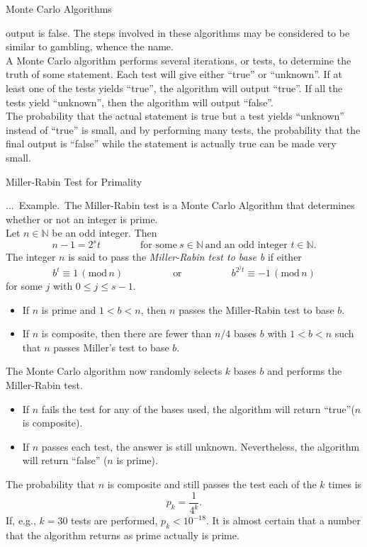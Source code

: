 \documentclass[smaller,hyperref={CJKbookmarks=true}]{beamer}
\newcommand{\N}{\mathbb{N}} \newcommand{\Z}{\mathbb{Z}} \newcommand{\Q}{\mathbb{Q}}
\newcounter{zhuo}[subsection]
\renewcommand{\thezhuo}{\thesection.\thesubsection.\arabic{zhuo}}
\newenvironment{EXAMPLE}{\stepcounter{zhuo}\alert{\!\thezhuo.~Example.\,}}{}
\begin{document}
\begin{frame}{Monte Carlo Algorithms}
\begin{spacing}{1.1}
output is false. The steps involved in these algorithms may be considered
to be similar to gambling, whence the name.\\[6pt]
A Monte Carlo algorithm performs several iterations, or tests, to determine
the truth of some statement. Each test will give either ``true'' or
``unknown''. If at least one of the tests yields ``true'', the algorithm will
output ``true''. If all the tests yield ``unknown'', then the algorithm will
output ``false''.\\[6pt]
The probability that the actual statement is true but a test yields
``unknown'' instead of ``true'' is small, and by performing many tests, the
probability that the final output is ``false'' while the statement is actually
true can be made very small.
\end{spacing}
\end{frame}
\begin{frame}{Miller-Rabin Test for Primality}
\begin{spacing}{1.05}
\begin{EXAMPLE}
The Miller-Rabin test is a Monte Carlo Algorithm that
determines whether or not an integer is prime.\\[6pt]
\end{EXAMPLE}
Let $n\in\N$ be an odd integer. Then
\[n-1=2^st\qquad\qquad\text{for some}~s\in\N~\text{and an odd integer }t\in\N.\]
The integer $n$ is said to pass the \emph{Miller-Rabin test to base b} if either
\[b^t\equiv1\,(\text{mod}\,n)\qquad\qquad\quad
\text{or}\qquad\qquad\quad b^{2^jt}\equiv-1\,(\text{mod}\,n)\]
for some $j$ with $0\leq j\leq s-1$.
\begin{itemize}
  \item If $n$ is prime and $1<b<n$, then $n$ passes the Miller-Rabin test to base $b$.
  \item If $n$ is composite, then there are fewer than $n/4$ bases $b$ with $1<b<n$ such that $n$ passes Miller's test to base $b$.
\end{itemize}
\newpage
\vspace*{7pt}
The Monte Carlo algorithm now randomly selects $k$ bases $b$ and performs
the Miller-Rabin test.\\[2pt]
\begin{itemize}
  \item If $n$ fails the test for any of the bases used, the algorithm will return ``true''($n$ is composite).
  \item If $n$ passes each test, the answer is still unknown. Nevertheless, the algorithm will return ``false'' ($n$ is prime).
\end{itemize}
The probability that $n$ is composite and still passes the test each of the $k$
times is
\[p_k=\frac{1}{4^k}.\]
If, e.g., $k=30$ tests are performed, $p_k<10^{-18}$. It is almost certain that a
number that the algorithm returns as prime actually is prime.
\end{spacing}
\end{frame}
\end{document}
